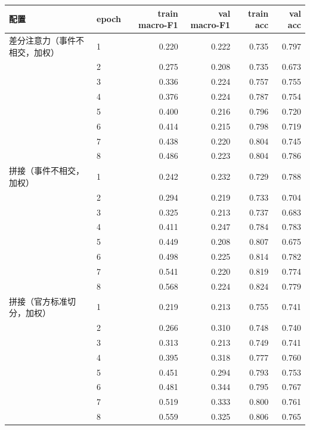 \begin{tabular}{llrrrr}
\hline
配置 & epoch & train macro-F1 & val macro-F1 & train acc & val acc \\
\hline
差分注意力（事件不相交，加权） & 1 & 0.220 & 0.222 & 0.735 & 0.797 \\
 & 2 & 0.275 & 0.208 & 0.735 & 0.673 \\
 & 3 & 0.336 & 0.224 & 0.757 & 0.755 \\
 & 4 & 0.376 & 0.224 & 0.787 & 0.754 \\
 & 5 & 0.400 & 0.216 & 0.796 & 0.720 \\
 & 6 & 0.414 & 0.215 & 0.798 & 0.719 \\
 & 7 & 0.438 & 0.220 & 0.804 & 0.745 \\
 & 8 & 0.486 & 0.223 & 0.804 & 0.786 \\
\hline
拼接（事件不相交，加权） & 1 & 0.242 & 0.232 & 0.729 & 0.788 \\
 & 2 & 0.294 & 0.219 & 0.733 & 0.704 \\
 & 3 & 0.325 & 0.213 & 0.737 & 0.683 \\
 & 4 & 0.411 & 0.247 & 0.784 & 0.783 \\
 & 5 & 0.449 & 0.208 & 0.807 & 0.675 \\
 & 6 & 0.498 & 0.225 & 0.814 & 0.782 \\
 & 7 & 0.541 & 0.220 & 0.819 & 0.774 \\
 & 8 & 0.568 & 0.224 & 0.824 & 0.779 \\
\hline
拼接（官方标准切分，加权） & 1 & 0.219 & 0.213 & 0.755 & 0.741 \\
 & 2 & 0.266 & 0.310 & 0.748 & 0.740 \\
 & 3 & 0.313 & 0.213 & 0.749 & 0.741 \\
 & 4 & 0.395 & 0.318 & 0.777 & 0.760 \\
 & 5 & 0.451 & 0.294 & 0.793 & 0.753 \\
 & 6 & 0.481 & 0.344 & 0.795 & 0.767 \\
 & 7 & 0.519 & 0.333 & 0.800 & 0.761 \\
 & 8 & 0.559 & 0.325 & 0.806 & 0.765 \\
\hline
\end{tabular}
